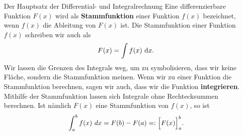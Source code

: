 \documentclass[../../main.tex]{subfiles}
\begin{document}
\begin{nutshell}{Der Hauptsatz der Differential- und Integralrechnung}
    Eine differenzierbare Funktion $F(x)$ wird als \textbf{Stammfunktion} einer Funktion $f(x)$ bezeichnet, 
    wenn $f(x)$ die Ableitung von $F(x)$ ist. Die Stammfunktion einer Funktion $f(x)$ schreiben wir auch als
    \[F(x)=\int f(x)\mathop{}\mathrm{d} x.\]
    Wir lassen die Grenzen des Integrals weg, um zu symbolisieren, dass wir keine Fläche, sondern die Stammfunktion
    meinen. Wenn wir zu einer Funktion die Stammfunktion berechnen, sagen wir auch, dass wir die Funktion
    \textbf{integrieren}. Mithilfe der Stammfunktion lassen sich Integrale ohne Rechtecksummen berechnen. Ist nämlich $F(x)$
    eine Stammfunktion von $f(x)$, so ist
    \[\int_a^b f(x)~dx=F(b)-F(a)=:\Bigl[F(x)\Bigr]_a^b.\]
\end{nutshell}
\end{document}
